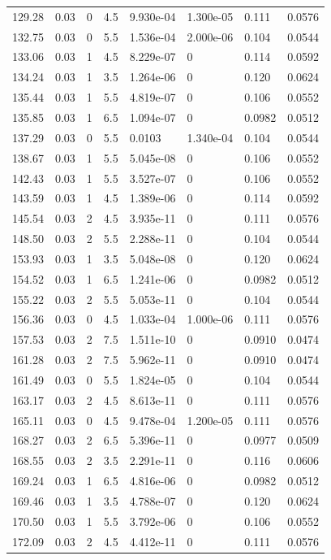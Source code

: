 \documentclass[preview]{standalone}
\begin{document}
{{{\begin{tabular}{L{1.2cm}C{1.2cm} C{0.3cm}C{0.5cm} C{1.4cm}C{1.4cm} C{1.4cm}C{1.4cm}}
  129.28  &  0.03  & 0     & 4.5 &  9.930e-04  & 1.300e-05  & 0.111 &  0.0576   \\ 
  132.75  &  0.03  & 0     & 5.5 &  1.536e-04  & 2.000e-06  & 0.104 &  0.0544   \\ 
  133.06  &  0.03  & 1     & 4.5 &  8.229e-07  & 0  & 0.114 &  0.0592   \\ 
  134.24  &  0.03  & 1     & 3.5 &  1.264e-06  & 0  & 0.120 &  0.0624   \\ 
  135.44  &  0.03  & 1     & 5.5 &  4.819e-07  & 0  & 0.106 &  0.0552   \\ 
  135.85  &  0.03  & 1     & 6.5 &  1.094e-07  & 0  & 0.0982 &  0.0512   \\ 
  137.29  &  0.03  & 0     & 5.5 &  0.0103  & 1.340e-04  & 0.104 &  0.0544   \\ 
  138.67  &  0.03  & 1     & 5.5 &  5.045e-08  & 0  & 0.106 &  0.0552   \\ 
  142.43  &  0.03  & 1     & 5.5 &  3.527e-07  & 0  & 0.106 &  0.0552   \\ 
  143.59  &  0.03  & 1     & 4.5 &  1.389e-06  & 0  & 0.114 &  0.0592   \\ 
  145.54  &  0.03  & 2     & 4.5 &  3.935e-11  & 0  & 0.111 &  0.0576   \\ 
  148.50  &  0.03  & 2     & 5.5 &  2.288e-11  & 0  & 0.104 &  0.0544   \\ 
  153.93  &  0.03  & 1     & 3.5 &  5.048e-08  & 0  & 0.120 &  0.0624   \\ 
  154.52  &  0.03  & 1     & 6.5 &  1.241e-06  & 0  & 0.0982 &  0.0512   \\ 
  155.22  &  0.03  & 2     & 5.5 &  5.053e-11  & 0  & 0.104 &  0.0544   \\ 
  156.36  &  0.03  & 0     & 4.5 &  1.033e-04  & 1.000e-06  & 0.111 &  0.0576   \\ 
  157.53  &  0.03  & 2     & 7.5 &  1.511e-10  & 0  & 0.0910 &  0.0474   \\ 
  161.28  &  0.03  & 2     & 7.5 &  5.962e-11  & 0  & 0.0910 &  0.0474   \\ 
  161.49  &  0.03  & 0     & 5.5 &  1.824e-05  & 0  & 0.104 &  0.0544   \\ 
  163.17  &  0.03  & 2     & 4.5 &  8.613e-11  & 0  & 0.111 &  0.0576   \\ 
  165.11  &  0.03  & 0     & 4.5 &  9.478e-04  & 1.200e-05  & 0.111 &  0.0576   \\ 
  168.27  &  0.03  & 2     & 6.5 &  5.396e-11  & 0  & 0.0977 &  0.0509   \\ 
  168.55  &  0.03  & 2     & 3.5 &  2.291e-11  & 0  & 0.116 &  0.0606   \\ 
  169.24  &  0.03  & 1     & 6.5 &  4.816e-06  & 0  & 0.0982 &  0.0512   \\ 
  169.46  &  0.03  & 1     & 3.5 &  4.788e-07  & 0  & 0.120 &  0.0624   \\ 
  170.50  &  0.03  & 1     & 5.5 &  3.792e-06  & 0  & 0.106 &  0.0552   \\ 
  172.09  &  0.03  & 2     & 4.5 &  4.412e-11  & 0  & 0.111 &  0.0576   \\ 
\hline 
\end{tabular} 

}}}
\end{document}
